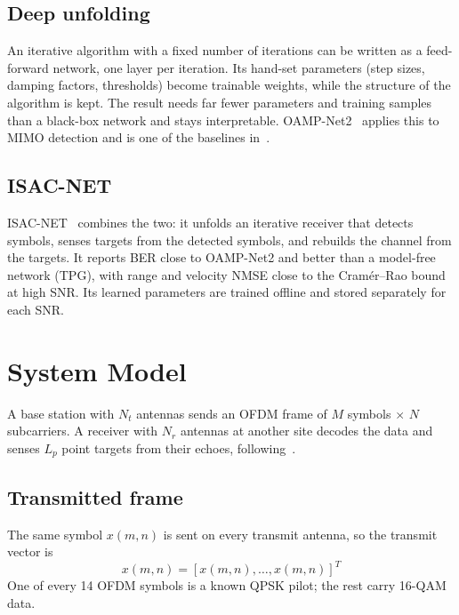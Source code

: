 \documentclass[11pt,a4paper]{article}
\begin{document}
\subsection{Deep unfolding}
An iterative algorithm with a fixed number of iterations can be written as a feed-forward network, one layer per iteration. Its hand-set parameters (step sizes, damping factors, thresholds) become trainable weights, while the structure of the algorithm is kept. The result needs far fewer parameters and training samples than a black-box network and stays interpretable. OAMP-Net2~\cite{oampnet} applies this to MIMO detection and is one of the baselines in~\cite{isacnet}.

\subsection{ISAC-NET}
ISAC-NET~\cite{isacnet} combines the two: it unfolds an iterative receiver that detects symbols, senses targets from the detected symbols, and rebuilds the channel from the targets. It reports BER close to OAMP-Net2 and better than a model-free network (TPG), with range and velocity NMSE close to the Cram\'er--Rao bound at high SNR. Its learned parameters are trained offline and stored separately for each SNR.

\section{System Model}\label{sec:model}
A base station with $N_t$ antennas sends an OFDM frame of $M$ symbols $\times$ $N$ subcarriers. A receiver with $N_r$ antennas at another site decodes the data and senses $L_p$ point targets from their echoes, following~\cite[Sec.~II]{isacnet}.

\subsection{Transmitted frame}
The same symbol $x(m,n)$ is sent on every transmit antenna, so the transmit vector is 
\begin{equation}
    {x}(m,n)=[x(m,n),\dots,x(m,n)]^T
\end{equation}One of every 14 OFDM symbols is a known QPSK pilot; the rest carry 16-QAM data.
\end{document}

